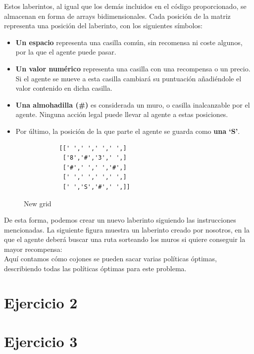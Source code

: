 \documentclass[12pt]{article}
\begin{document}
Estos laberintos, al igual que los demás incluidos en el código proporcionado, se almacenan en forma de arrays bidimensionales. Cada posición de la matriz representa una posición del laberinto, con los siguientes símbolos:
\begin{itemize}
    \item \textbf{Un espacio} representa una casilla común, sin recomensa ni coste algunos, por la que el agente puede pasar.
    \item \textbf{Un valor numérico} representa una casilla con una recompensa o un precio. Si el agente se mueve a esta casilla cambiará su puntuación añadiéndole el valor contenido en dicha casilla.
    \item \textbf{Una almohadilla (\#)} es considerada un muro, o casilla inalcanzable por el agente. Ninguna acción legal puede llevar al agente a estas posiciones.
    \item Por último, la posición de la que parte el agente se guarda como \textbf{una `S'}.
\end{itemize}

\newpage
\begin{figure}
    \begin{verbatim}
          [[' ',' ',' ',' ',]
           ['8','#','3',' ',]
           ['#',' ',' ','#',]
           [' ',' ',' ',' ',]
           [' ','S','#',' ',]]
    \end{verbatim}
    \vspace{-20pt}
    \caption{New grid}
    \vspace{-10pt}
\end{figure}
De esta forma, podemos crear un nuevo laberinto siguiendo las instrucciones mencionadas. La siguiente figura muestra un laberinto creado por nosotros, en la que el agente deberá buscar una ruta sorteando los muros si quiere conseguir la mayor recompensa:\\[1em]

\huge Aquí contamos cómo cojones se pueden sacar varias políticas óptimas, describiendo todas las políticas óptimas para este problema. \small

\newpage
\section{Ejercicio 2}
\section{Ejercicio 3}
\end{document}
